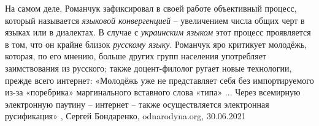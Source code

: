 На самом деле, Романчук зафиксировал в своей работе объективный процесс,
который называется \emph{языковой конвергенцией} – увеличением числа общих черт в
языках или в диалектах. В случае с \emph{украинским языком} этот процесс проявляется в
том, что он крайне близок \emph{русскому языку}. Романчук яро критикует молодёжь,
которая, по его мнению, больше других групп населения употребляет заимствования
из русского; также доцент-филолог ругает новые технологии, прежде всего
интернет: «Молодёжь уже не представляет себя без импортируемого из-за
«поребрика» маргинального вставного слова «типа» ... Через всемирную
электронную паутину – интернет – также осуществляется электронная русификация»
, 
Сергей Бондаренко, odnarodyna.org, 30.06.2021



